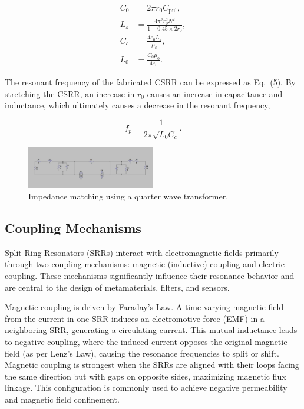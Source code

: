 \documentclass[conference]{IEEEtran}
\begin{document}
\begin{align}
    C_0 &= 2\pi r_0 C_{\text{pul}},  \\
    L_s &= \frac{4\pi^2 r_0^2 N^2}{1 + 0.45 \times 2 r_0},  \\
    C_c &= \frac{4 \varepsilon_0 L_s}{\mu_0},  \\
    L_0 &= \frac{C_0 \mu_0}{4 \varepsilon_0}. 
    \end{align}
    
    The resonant frequency of the fabricated CSRR can be expressed as Eq.~(5). By stretching the CSRR, an increase in \( r_0 \) causes an increase in capacitance and inductance, which ultimately causes a decrease in the resonant frequency,
    
    \begin{equation}
    f_p = \frac{1}{2\pi \sqrt{L_0 C_c}}. 
    \end{equation}

\begin{figure}[h]
\centering
    \includegraphics[width=0.5\textwidth]{Images/transmission_line_quarter_wave.jpg}
    \caption{Impedance matching using a quarter wave transformer.}
\end{figure}

\subsection{Coupling Mechanisms}
Split Ring Resonators (SRRs) interact with electromagnetic fields primarily through two coupling mechanisms: magnetic (inductive) coupling and electric coupling. These mechanisms significantly influence their resonance behavior and are central to the design of metamaterials, filters, and sensors.

Magnetic coupling is driven by Faraday’s Law. A time-varying magnetic field from the current in one SRR induces an electromotive force (EMF) in a neighboring SRR, generating a circulating current. This mutual inductance leads to negative coupling, where the induced current opposes the original magnetic field (as per Lenz’s Law), causing the resonance frequencies to split or shift. Magnetic coupling is strongest when the SRRs are aligned with their loops facing the same direction but with gaps on opposite sides, maximizing magnetic flux linkage. This configuration is commonly used to achieve negative permeability and magnetic field confinement.
\end{document}
